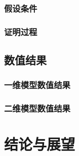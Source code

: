 			\subsubsection{假设条件}

			\subsubsection{证明过程}
			
		\subsection{数值结果}
		
			\subsubsection{一维模型数值结果}
			
			\subsubsection{二维模型数值结果}	

	\section{结论与展望}